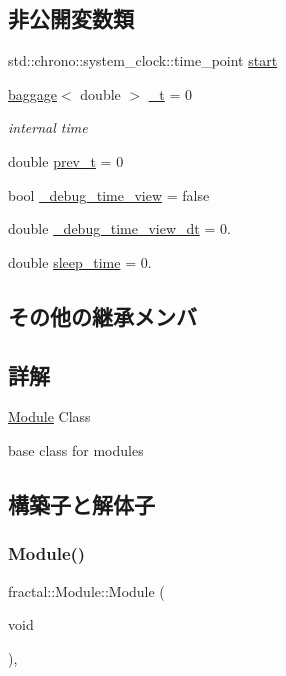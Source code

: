 \subsection*{非公開変数類}
\begin{DoxyCompactItemize}
\item 
std\+::chrono\+::system\+\_\+clock\+::time\+\_\+point \hyperlink{classfractal_1_1Module_a869fe7b6421f11439ac696867a71d9eb}{start}
\item 
\hyperlink{classfractal_1_1baggage}{baggage}$<$ double $>$ \hyperlink{classfractal_1_1Module_a36d598812541ddb73bb733dbcd708974}{\+\_\+t} = 0
\begin{DoxyCompactList}\small\item\em internal time \end{DoxyCompactList}\item 
double \hyperlink{classfractal_1_1Module_a47a4704bcfc9255a2e2ee8c81676a9f8}{prev\+\_\+t} = 0
\item 
bool \hyperlink{classfractal_1_1Module_a10311e3d5bff39ed0facbfe3b0eb9f0d}{\+\_\+debug\+\_\+time\+\_\+view} = false
\item 
double \hyperlink{classfractal_1_1Module_adb17cd3c5a3edc29e0716d0f7abde9e8}{\+\_\+debug\+\_\+time\+\_\+view\+\_\+dt} = 0.
\item 
double \hyperlink{classfractal_1_1Module_a8f01c07a782ebc8bbdab28212e275979}{sleep\+\_\+time} = 0.
\end{DoxyCompactItemize}
\subsection*{その他の継承メンバ}


\subsection{詳解}
\hyperlink{classfractal_1_1Module}{Module} Class 

base class for modules 

\subsection{構築子と解体子}
\mbox{\label{classfractal_1_1Module_a43c2b0b93b603ee601af3c90931ff7f6}} 
\subsubsection{\texorpdfstring{Module()}{Module()}}
{\footnotesize\ttfamily fractal\+::\+Module\+::\+Module (\begin{DoxyParamCaption}\item[{void}]{ }\end{DoxyParamCaption})\hspace{0.3cm}{\ttfamily [inline]}, {\ttfamily [protected]}}




